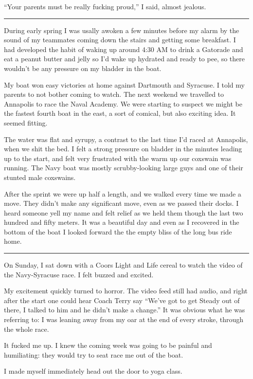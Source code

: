 ``Your parents must be really fucking proud,'' I said, almost jealous.

\plainfancybreak{12pt}{2}{* * *}

During early spring I was usally awoken a few minutes before my alarm by the
sound of my teammates coming down the stairs and getting some breakfast.  I had
developed the habit of waking up around 4:30 AM to drink a Gatorade and eat a
peanut butter and jelly so I'd wake up hydrated and ready to pee, so there
wouldn't be any pressure on my bladder in the boat. 

My boat won easy victories at home against Dartmouth and Syracuse.  I told my
parents to not bother coming to watch.  The next weekend we travelled to
Annapolis to race the Naval Academy.  We were starting to suspect we might be
the fastest fourth boat in the east, a sort of comical, but also exciting idea.
It seemed fitting.  

The water was flat and syrupy, a contrast to the last time I'd raced at
Annapolis, when we shit the bed.  I felt a strong pressure on bladder in the
minutes leading up to the start, and felt very frustrated with the warm up our
coxswain was running.  The Navy boat was mostly scrubby-looking large guys and
one of their stunted male coxswains.

After the sprint we were up half a length, and we walked every time we made a
move.  They didn't make any significant move, even as we passed their docks.  I
heard someone yell my name and felt relief as we held them though the last
two hundred and fifty meters.  It was a beautiful day and even as I recovered in
the bottom of the boat I looked forward the the empty bliss of the long bus ride
home.

\plainfancybreak{12pt}{2}{* * *}

On Sunday, I sat down with a Coors Light and Life cereal to watch the video of
the Navy-Syracuse race.  I felt buzzed and excited. 

My excitement quickly turned to horror.  The video feed still had audio, and
right after the start one could hear Coach Terry say ``We've got to get Steady
out of there, I talked to him and he didn't make a change.''  It was obvious
what he was referring to: I was leaning away from my oar at the end of every
stroke, through the whole race.

It fucked me up.  I knew the coming week was going to be painful and
humiliating: they would try to seat race me out of the boat.

I made myself immediately head out the door to yoga class.  


